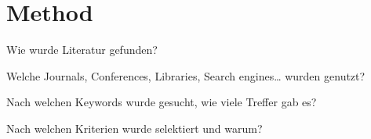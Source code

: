 \chapter{Method}
\label{ch:method}

Wie wurde Literatur gefunden?

Welche Journals, Conferences, Libraries, Search engines… wurden genutzt?

Nach welchen Keywords wurde gesucht, wie viele Treffer gab es?

Nach welchen Kriterien wurde selektiert und warum?
